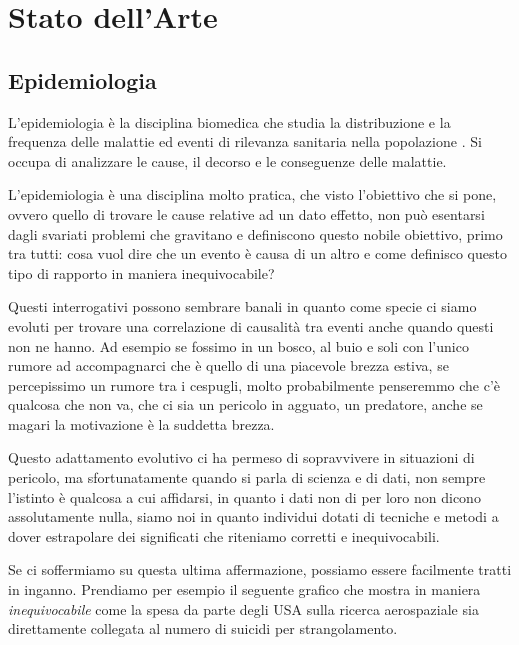 \section{Stato dell'Arte}

\subsection{Epidemiologia}
L'epidemiologia è la disciplina biomedica che studia la 
distribuzione e la frequenza delle malattie ed eventi di 
rilevanza sanitaria nella popolazione \cite{wiki:Epidemiologia}.
Si occupa di analizzare le cause, il decorso e le 
conseguenze delle malattie.\cite{Galea2009-lj} \cite{Parascandola2001-kw}

L'epidemiologia è una disciplina molto pratica, che visto 
l'obiettivo che si pone, ovvero quello di trovare le cause
relative ad un dato effetto, non può esentarsi dagli 
svariati problemi che gravitano e definiscono questo 
nobile obiettivo, primo tra tutti: cosa vuol dire che un
evento è causa di un altro e come definisco questo 
tipo di rapporto in maniera inequivocabile?

Questi interrogativi possono sembrare banali in quanto 
come specie ci siamo evoluti per trovare una correlazione
di causalità tra eventi anche quando questi non ne hanno.
Ad esempio se fossimo in un bosco, al buio e soli con
l'unico rumore ad accompagnarci che è quello di una 
piacevole brezza estiva, se percepissimo un rumore tra 
i cespugli, molto probabilmente penseremmo che c'è 
qualcosa che non va, che ci sia un pericolo in agguato,
un predatore, anche se magari la motivazione è 
la suddetta brezza. 

Questo adattamento evolutivo ci ha permeso di sopravvivere
in situazioni di pericolo, ma sfortunatamente quando 
si parla di scienza e di dati, non sempre l'istinto è 
qualcosa a cui affidarsi, in quanto i dati non di 
per loro non dicono assolutamente nulla, siamo noi 
in quanto individui dotati di tecniche e metodi a dover
estrapolare dei significati che riteniamo corretti e inequivocabili.

Se ci soffermiamo su questa ultima affermazione, possiamo
essere facilmente tratti in inganno. Prendiamo per esempio 
il seguente grafico che mostra in maniera \emph{inequivocabile} 
come la spesa da parte degli USA sulla ricerca aerospaziale sia 
direttamente collegata al numero di suicidi per strangolamento. 

